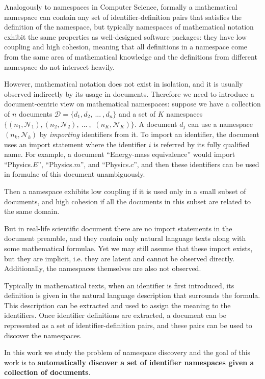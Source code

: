 
Analogously to namespaces in Computer Science, formally a mathematical namespace
can contain any set of identifier-definition pairs that satisfies the definition of
the namespace, but typically namespaces of mathematical notation
exhibit the same properties as well-designed software packages: they
have low coupling and high cohesion, meaning that all definitions
in a namespace
come from the same area of mathematical knowledge and the definitions
from different namespace do not intersect heavily.

However, mathematical notation does not exist in isolation, and it is usually
observed indirectly by its usage in documents.
Therefore we need to introduce a document-centric view on mathematical
namespaces: suppose we have a collection of $n$ documents
$\mathcal D = \{ d_1, d_2, \ ... \ , d_n \}$ and a set of $K$ namespaces
$\big\{(n_1, \mathcal N_1), (n_2, \mathcal N_2), \ ... \ ,$ $(n_K, \mathcal N_K) \big\}$.
A document $d_j$ can use a namespace $(n_k, \mathcal N_k)$ by \emph{importing}
identifiers from it. To import an identifier, the document uses an import statement
where the identifier $i$ is referred by its fully qualified name.
For example, a document ``Energy-mass equivalence'' would import
``Physics.$E$'', ``Physics.$m$'', and ``Physics.$c$'', and then
these identifiers can be used in formulae of this document unambiguously.

Then a namespace exhibits low coupling if it is used only in a small 
subset of documents, and high cohesion if all the documents in this subset 
are related to the same domain. 

But in real-life scientific document there are no import statements
in the document preamble, and they contain only natural language
texts along with some mathematical formulae. Yet we may still assume
that these import exists, but they are implicit, i.e. they are latent
and cannot be observed directly. Additionally, the namespaces themselves are
also not observed.

Typically in mathematical texts, when an identifier is first introduced, 
its definition is given in the natural language description that surrounds 
the formula. This description can be extracted and used to assign the meaning to
the identifiers. Once identifier definitions are extracted, a document
can be represented as a set of identifier-definition pairs,
and these pairs can be used to discover the namespaces.


In this work we study the problem of namespace discovery and the
goal of this work is to \textbf{automatically discover a set of identifier
namespaces given a collection of documents}.

